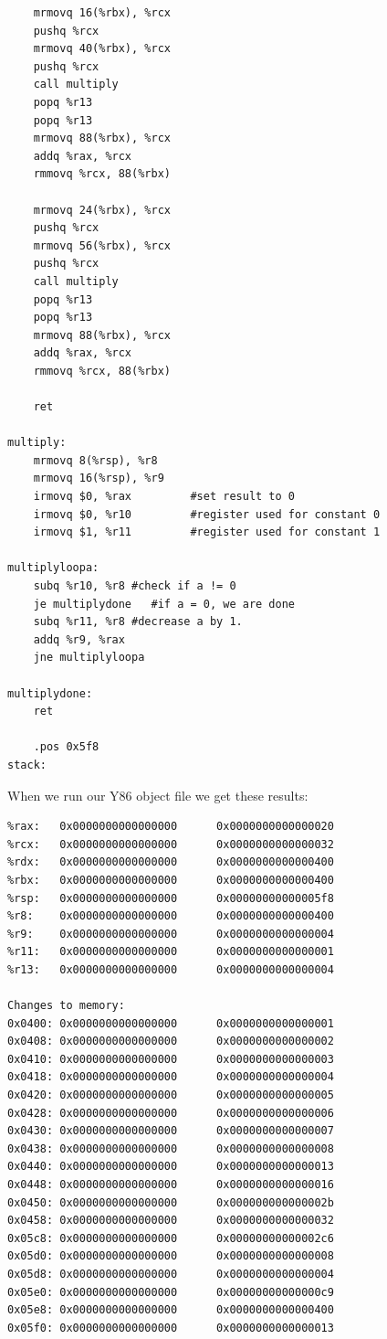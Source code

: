 \documentclass{article}
\begin{document}
\begin{verbatim}
    mrmovq 16(%rbx), %rcx
    pushq %rcx
    mrmovq 40(%rbx), %rcx
    pushq %rcx
    call multiply
    popq %r13
    popq %r13
    mrmovq 88(%rbx), %rcx
    addq %rax, %rcx
    rmmovq %rcx, 88(%rbx)
    
    mrmovq 24(%rbx), %rcx
    pushq %rcx
    mrmovq 56(%rbx), %rcx
    pushq %rcx
    call multiply
    popq %r13
    popq %r13
    mrmovq 88(%rbx), %rcx
    addq %rax, %rcx
    rmmovq %rcx, 88(%rbx)
    
    ret
    
multiply:
    mrmovq 8(%rsp), %r8
    mrmovq 16(%rsp), %r9
    irmovq $0, %rax         #set result to 0
    irmovq $0, %r10         #register used for constant 0
    irmovq $1, %r11         #register used for constant 1
    
multiplyloopa:
    subq %r10, %r8 #check if a != 0
    je multiplydone   #if a = 0, we are done
    subq %r11, %r8 #decrease a by 1.
    addq %r9, %rax
    jne multiplyloopa
    
multiplydone:
    ret
    
    .pos 0x5f8
stack:
\end{verbatim}
When we run our Y86 object file we get these results:
\begin{verbatim}
%rax:   0x0000000000000000      0x0000000000000020
%rcx:   0x0000000000000000      0x0000000000000032
%rdx:   0x0000000000000000      0x0000000000000400
%rbx:   0x0000000000000000      0x0000000000000400
%rsp:   0x0000000000000000      0x00000000000005f8
%r8:    0x0000000000000000      0x0000000000000400
%r9:    0x0000000000000000      0x0000000000000004
%r11:   0x0000000000000000      0x0000000000000001
%r13:   0x0000000000000000      0x0000000000000004

Changes to memory:
0x0400: 0x0000000000000000      0x0000000000000001
0x0408: 0x0000000000000000      0x0000000000000002
0x0410: 0x0000000000000000      0x0000000000000003
0x0418: 0x0000000000000000      0x0000000000000004
0x0420: 0x0000000000000000      0x0000000000000005
0x0428: 0x0000000000000000      0x0000000000000006
0x0430: 0x0000000000000000      0x0000000000000007
0x0438: 0x0000000000000000      0x0000000000000008
0x0440: 0x0000000000000000      0x0000000000000013
0x0448: 0x0000000000000000      0x0000000000000016
0x0450: 0x0000000000000000      0x000000000000002b
0x0458: 0x0000000000000000      0x0000000000000032
0x05c8: 0x0000000000000000      0x00000000000002c6
0x05d0: 0x0000000000000000      0x0000000000000008
0x05d8: 0x0000000000000000      0x0000000000000004
0x05e0: 0x0000000000000000      0x00000000000000c9
0x05e8: 0x0000000000000000      0x0000000000000400
0x05f0: 0x0000000000000000      0x0000000000000013
\end{verbatim}
\end{document}
